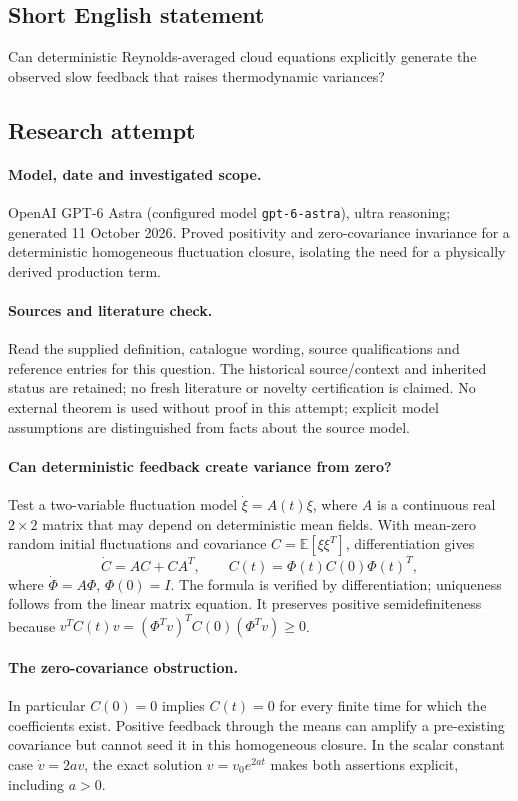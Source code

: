 \documentclass[11pt]{article}
\begin{document}
\subsection{Short English statement}
Can deterministic Reynolds-averaged cloud equations explicitly generate the observed slow feedback that raises thermodynamic variances?
\subsection{Research attempt}
\paragraph{Model, date and investigated scope.}
OpenAI GPT-6 Astra (configured model \texttt{gpt-6-astra}), ultra reasoning; generated 11 October 2026. Proved positivity and zero-covariance invariance for a deterministic homogeneous fluctuation closure, isolating the need for a physically derived production term.

\paragraph{Sources and literature check.}
Read the supplied definition, catalogue wording, source qualifications and reference entries for this question. The historical source/context and inherited status are retained; no fresh literature or novelty certification is claimed. No external theorem is used without proof in this attempt; explicit model assumptions are distinguished from facts about the source model.

\paragraph{Can deterministic feedback create variance from zero?} Test a two-variable fluctuation model \(\dot\xi=A(t)\xi\), where \(A\) is a continuous real \(2\times2\) matrix that may depend on deterministic mean fields. With mean-zero random initial fluctuations and covariance \(C=\mathbb E[\xi\xi^T]\), differentiation gives
\[
 \dot C=AC+CA^T,\qquad C(t)=\Phi(t)C(0)\Phi(t)^T,
\]
where \(\dot\Phi=A\Phi\), \(\Phi(0)=I\). The formula is verified by differentiation; uniqueness follows from the linear matrix equation. It preserves positive semidefiniteness because \(v^TC(t)v=(\Phi^Tv)^TC(0)(\Phi^Tv)\ge0\).
\paragraph{The zero-covariance obstruction.} In particular \(C(0)=0\) implies \(C(t)=0\) for every finite time for which the coefficients exist. Positive feedback through the means can amplify a pre-existing covariance but cannot seed it in this homogeneous closure. In the scalar constant case \(\dot v=2av\), the exact solution \(v=v_0e^{2at}\) makes both assertions explicit, including \(a>0\).
\end{document}
